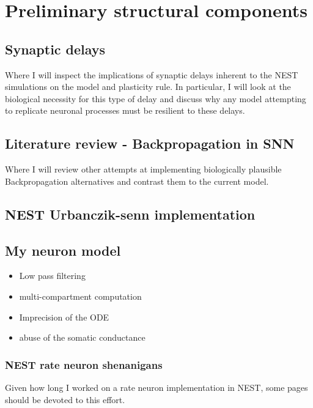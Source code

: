 \documentclass[11pt,a4paper,titlepage]{report}
\begin{document}
\newpage

\chapter{Preliminary structural components}

\section{Synaptic delays}

Where I will inspect the implications of synaptic delays inherent to the NEST simulations on
the model and plasticity rule. In particular, I will look at the biological necessity for this
type of delay and discuss why any model attempting to replicate neuronal processes must be resilient
to these delays.


\section{Literature review - Backpropagation in SNN}

Where I will review other attempts at implementing biologically plausible Backpropagation
alternatives and contrast them to the current model.

\section{NEST Urbanczik-senn implementation}


\section{My neuron model}

\begin{itemize}
  \item Low pass filtering
  \item multi-compartment computation
  \item Imprecision of the ODE
  \item abuse of the somatic conductance
\end{itemize}

\subsection{NEST rate neuron shenanigans}

Given how long I worked on a rate neuron implementation in NEST, some pages should be devoted
to this effort.
\end{document}
